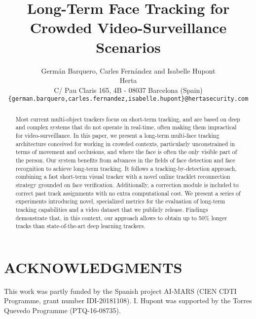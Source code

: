 \documentclass[10pt,twocolumn,letterpaper]{article}
\def\mycopyrightnotice{
{\hfill \footnotesize 978-1-7281-9186-7/20/\$31.00 \copyright 2020 IEEE\hfill}
}
\begin{document}
\title{Long-Term Face Tracking for Crowded Video-Surveillance Scenarios}

\author{Germán Barquero, Carles Fernández and Isabelle Hupont\\
Herta\\
C/ Pau Claris 165, 4B - 08037 Barcelona (Spain)\\
{\tt\small \{german.barquero,carles.fernandez,isabelle.hupont\}@hertasecurity.com}
}

\maketitle
\thispagestyle{empty}

\begin{abstract}
Most current multi-object trackers focus on short-term tracking, and are based on deep and complex systems that do not operate in real-time, often making them impractical for video-surveillance. In this paper, we present a long-term multi-face tracking architecture conceived for working in crowded contexts, particularly unconstrained in terms of movement and occlusions, and where the face is often the only visible part of the person. Our system benefits from advances in the fields of face detection and face recognition to achieve long-term tracking. It follows a tracking-by-detection approach, combining a fast short-term visual tracker with a novel online tracklet reconnection strategy grounded on face verification. Additionally, a correction module is included to correct past track assignments with no extra computational cost. We present a series of experiments introducing novel, specialized metrics for the evaluation of long-term tracking capabilities and a video dataset that we publicly release. Findings demonstrate that, in this context, our approach allows to obtain up to 50\% longer tracks than state-of-the-art deep learning trackers.  
\end{abstract}

\let\thefootnote\relax\footnotetext{\mycopyrightnotice}








\section{ACKNOWLEDGMENTS}
This work was partly funded by the Spanish project AI-MARS (CIEN CDTI Programme, grant number IDI-20181108). I. Hupont was supported by the Torres Quevedo Programme (PTQ-16-08735).

{\small


}
\end{document}
